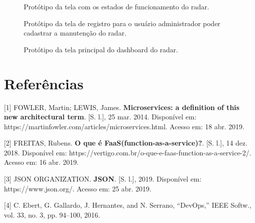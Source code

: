\begin{figure}[ht]
	\caption{\label{fig:tela_status} Protótipo da tela com os estados de funcionamento do radar.}
\end{figure}\newpage

\begin{figure}[ht]
	\caption{\label{fig:tela_registro} Protótipo da tela de registro para o usuário administrador poder cadastrar a manutenção do radar.}
\end{figure}\newpage

\begin{figure}[ht]
	\caption{\label{fig:tela_dashboard} Protótipo da tela principal do dashboard do radar.}
\end{figure}\newpage

\section{Referências}

[1] FOWLER, Martin; LEWIS, James.
\textbf{Microservices: a definition of this new architectural term}.
[S. l.], 25 mar. 2014. Disponível em: https://martinfowler.com/articles/microservices.html. Acesso em: 18 abr. 2019.

[2] FREITAS, Rubens.
\textbf{O que é FaaS(function-as-a-service)?}.
[S. l.], 14 dez. 2018. Disponível em: https://vertigo.com.br/o-que-e-faas-function-as-a-service-2/. Acesso em: 16 abr. 2019.

[3] JSON ORGANIZATION.
\textbf{JSON}. [S. l.], 2019. Disponível em: https://www.json.org/. Acesso em: 25 abr. 2019.

[4] C. Ebert, G. Gallardo, J. Hernantes, and N. Serrano, “DevOps,” IEEE Softw., vol. 33, no. 3, pp. 94–100, 2016.
